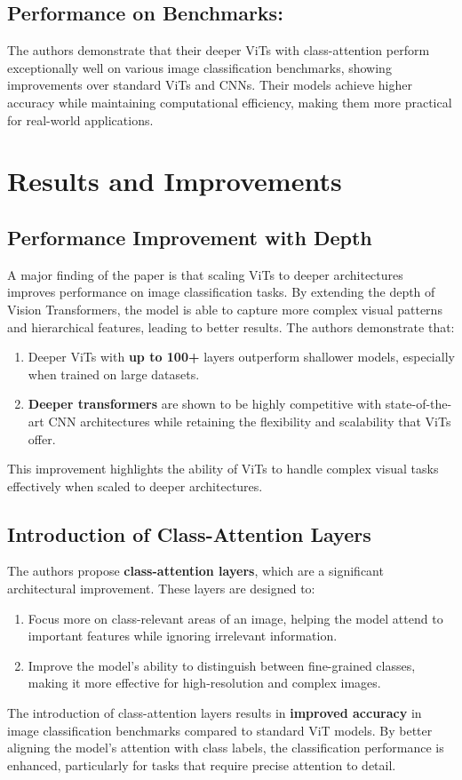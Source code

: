 \documentclass{report}
\begin{document}
	
	\subsection{Performance on Benchmarks:}
	The authors demonstrate that their deeper ViTs with class-attention perform exceptionally well on various image classification benchmarks, showing improvements over standard ViTs and CNNs. Their models achieve higher accuracy while maintaining computational efficiency, making them more practical for real-world applications.
	
	
	
	
	
	\section{Results and Improvements}
	\subsection{Performance Improvement with Depth}
	A major finding of the paper is that scaling ViTs to deeper architectures improves performance on image classification tasks. By extending the depth of Vision Transformers, the model is able to capture more complex visual patterns and hierarchical features, leading to better results. The authors demonstrate that:
	
	\begin{enumerate}
		\item 
		Deeper ViTs with \textbf{up to 100+} layers outperform shallower models, especially when trained on large datasets.
		
		\item 
		\textbf{Deeper transformers} are shown to be highly competitive with state-of-the-art CNN architectures while retaining the flexibility and scalability that ViTs offer.
	\end{enumerate}
	This improvement highlights the ability of ViTs to handle complex visual tasks effectively when scaled to deeper architectures.
	
	
	\subsection{Introduction of Class-Attention Layers}
	The authors propose \textbf{class-attention layers}, which are a significant architectural improvement. These layers are designed to:
	\begin{enumerate}
		\item 
		Focus more on class-relevant areas of an image, helping the model attend to important features while ignoring irrelevant information.
		
		\item 
		Improve the model's ability to distinguish between fine-grained classes, making it more effective for high-resolution and complex images.
	\end{enumerate}
	The introduction of class-attention layers results in \textbf{improved accuracy} in image classification benchmarks compared to standard ViT models. By better aligning the model’s attention with class labels, the classification performance is enhanced, particularly for tasks that require precise attention to detail.
	
\end{document}
